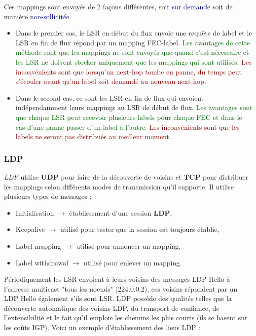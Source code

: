 \documentclass{article}
\newcommand{\gre}[1]{\textcolor{darkgreen}{#1}}
\newcommand{\blu}[1]{\textcolor{darkblue}{#1}}
\newcommand{\rouge}[1]{\textcolor{darkred}{#1}}
\newcommand{\term}[1]{\textit{\textcolor{maintitle}{#1}}}
\begin{document}
\begin{sffamily}
Ces mappings sont envoyés de 2 façons différentes, soit \blu{sur demande} soit de manière \blu{non-sollicitée}.
\begin{itemize}
\item Dans le premier cas, le LSR en début du flux envoie une requête de label et le LSR en fin de flux répond par un mapping 
FEC-label. \gre{Les avantages de cette méthode sont que les mappings ne sont envoyés que quand c'est nécessaire et les LSR ne 
doivent stocker uniquement que les mappings qui sont utilisés.} \rouge{Les inconvénients sont que lorsqu'un next-hop tombe en 
panne, du temps peut s'écouler avant qu'un label soit demandé au nouveau next-hop.}
\item Dans le second cas, ce sont les LSR en fin de flux qui envoient indépendamment leurs mappings au LSR de début de flux. 
\gre{Les avantages sont que chaque LSR peut recevoir plusieurs labels pour chaque FEC et dans le cas d'une panne passer d'un 
label à l'autre.} \rouge{Les inconvénients sont que les labels ne seront pas distribués au meilleur moment.} \\
\end{itemize}

\subsubsection{LDP}

\term{LDP} utilise \textbf{UDP} pour faire de la découverte de voisins et \textbf{TCP} pour distribuer les mappings selon 
différents modes de transmission qu'il supporte. Il utilise plusieurs types de messages :
\begin{itemize}
\item Initialisation $\rightarrow$ établissement d'une session \textbf{LDP},
\item Keepalive $\rightarrow$ utilisé pour tester que la session est toujours établie,
\item Label mapping $\rightarrow$ utilisé pour annoncer un mapping,
\item Label withdrawal $\rightarrow$ utilisé pour enlever un mapping.
\end{itemize}

Périodiquement les LSR envoient à leurs voisins des messages LDP Hello à l'adresse multicast "tous les noeuds" ($224.0.0.2$), 
ces voisins répondent par un LDP Hello également s'ils sont LSR. LDP possède des qualités telles que la découverte automatique 
des voisins LDP, du transport de confiance, de l'extensibilité et le fait qu'il emploie les chemins les plus courts (ils se 
basent sur les coûts IGP). Voici un exemple d'établissement des liens LDP :


\end{sffamily}
\end{document}
